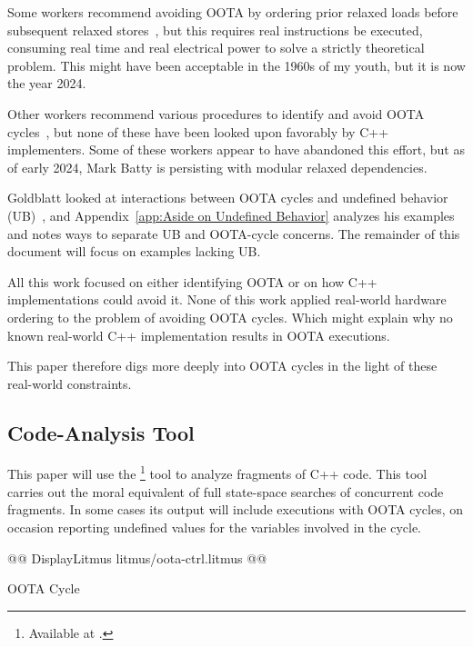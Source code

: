 \documentclass[10]{article}
\begin{document}
Some workers recommend avoiding OOTA by ordering prior relaxed
loads before subsequent relaxed
stores~\cite{Boehm:2014:OGA:2618128.2618134,HansBoehm2019OOTArevisitedAgain,Lahav:2017:RSC:3062341.3062352},
but this requires real instructions be executed, consuming real
time and real electrical power to solve a strictly theoretical
problem.
This might have been acceptable in the 1960s of my youth, but it is now
the year 2024.

Other workers recommend various procedures to identify and avoid OOTA
cycles~\cite{Lahav:2017:RSC:3062341.3062352,Sinclair:2017:CAR:3079856.3080206,Lee:10.1145/3385412.3386010,MarkBatty2019ModularRelaxedDependenciesOOTA},
but none of these have been looked upon favorably by C++ implementers.
Some of these workers appear to have abandoned this effort, but as of
early 2024, Mark Batty is persisting with modular relaxed dependencies.

Goldblatt looked at interactions between OOTA cycles and
undefined behavior (UB)~\cite{DavidGoldblatt2019NoElegantOOTAfix}, and
Appendix~\ref{app:Aside on Undefined Behavior}
analyzes his examples and notes ways to separate UB and OOTA-cycle
concerns.
The remainder of this document will focus on examples lacking UB.

All this work focused on either identifying OOTA or on how C++
implementations could avoid it.
None of this work applied real-world hardware ordering to the problem
of avoiding OOTA cycles.
Which might explain why no known real-world C++ implementation results
in OOTA executions.

This paper therefore digs more deeply into OOTA cycles in the light
of these real-world constraints.

\subsection{Code-Analysis Tool}
\label{sec:Code-Analysis Tool}

This paper will use the \footnote{
	Available at .}
tool to analyze fragments of C++ code.
This tool carries out the moral equivalent of full state-space searches
of concurrent code fragments.
In some cases its output will include executions with OOTA cycles,
on occasion reporting undefined values for the variables involved in
the cycle.

\begin{listing}[tbp]
@@ DisplayLitmus litmus/oota-ctrl.litmus @@
\caption{OOTA Cycle}
\label{lst:OOTA Cycle}
\end{listing}
\end{document}
